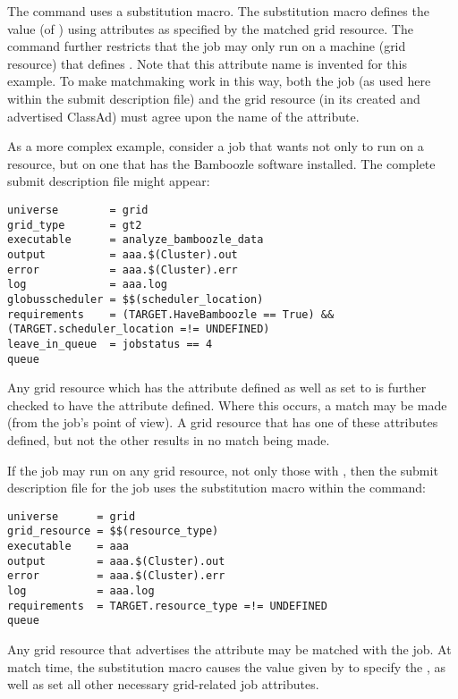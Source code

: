 The  command uses a substitution
macro.
The substitution macro defines the value 
(of ) using attributes
as specified by the matched grid resource.
The  command further restricts that
the job may only run on a machine (grid resource) that
defines .
Note that this attribute name is invented for this example.
To make matchmaking work in this way,
both the job (as used here within the submit description file)
and the grid resource (in its created and advertised ClassAd)
must agree upon the name of the attribute.

As a more complex example,
consider a job that wants not only to run on a  resource,
but on one that has the Bamboozle software installed.
The complete submit description file might appear:

\footnotesize
\begin{verbatim}
universe        = grid
grid_type       = gt2
executable      = analyze_bamboozle_data
output          = aaa.$(Cluster).out
error           = aaa.$(Cluster).err
log             = aaa.log
globusscheduler = $$(scheduler_location)
requirements    = (TARGET.HaveBamboozle == True) && (TARGET.scheduler_location =!= UNDEFINED)
leave_in_queue  = jobstatus == 4
queue
\end{verbatim}
\normalsize

Any grid resource which has the
 attribute defined as well as
set to  is further checked to have the
 attribute defined.
Where this occurs, a match may be made (from the
job's point of view).
A grid resource that has one of these attributes defined,
but not the other results in no match being made.

If the job may run on any grid resource,
not only those with
 ,
then the submit description file for the job
uses the substitution macro within the 
 command:

\footnotesize
\begin{verbatim}
universe      = grid
grid_resource = $$(resource_type)
executable    = aaa
output        = aaa.$(Cluster).out
error         = aaa.$(Cluster).err
log           = aaa.log
requirements  = TARGET.resource_type =!= UNDEFINED
queue
\end{verbatim}
\normalsize

Any grid resource that advertises the attribute 
may be matched with the job.
At match time,
the substitution macro causes the
value given by 
to specify the ,
as well as set all other necessary grid-related job attributes.

